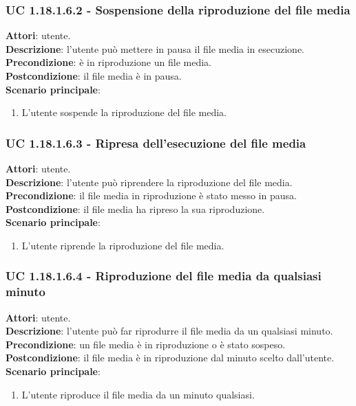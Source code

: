 	\subsubsection{UC 1.18.1.6.2 - Sospensione della riproduzione del file media}{
		\label{uc1.18.1.6.2}
		\textbf{Attori}: utente. \\
		\textbf{Descrizione}: l'utente può mettere in pausa il file media in esecuzione. \\
		\textbf{Precondizione}: è in riproduzione un file media.	\\
		\textbf{Postcondizione}: il file media è in pausa.\\
		\textbf{Scenario principale}:
		\begin{enumerate}
			\item L'utente sospende la riproduzione del file media.
		\end{enumerate}		
	}
	\subsubsection{UC 1.18.1.6.3 - Ripresa dell'esecuzione del file media}{
		\label{uc1.18.1.6.3}
		\textbf{Attori}: utente. \\
		\textbf{Descrizione}: l'utente può riprendere la riproduzione del file media. \\
		\textbf{Precondizione}: il file media in riproduzione è stato messo in pausa.	\\
		\textbf{Postcondizione}: il file media ha ripreso la sua riproduzione.\\
		\textbf{Scenario principale}:
		\begin{enumerate}
			\item L'utente riprende la riproduzione del file media.
		\end{enumerate}		
	}
	\subsubsection{UC 1.18.1.6.4 - Riproduzione del file media da qualsiasi minuto}{
		\label{uc1.18.1.6.4}
		\textbf{Attori}: utente. \\
		\textbf{Descrizione}: l'utente può far riprodurre il file media da un qualsiasi minuto. \\
		\textbf{Precondizione}: un file media è in riproduzione o è stato sospeso.	\\
		\textbf{Postcondizione}: il file media è in riproduzione dal minuto scelto dall'utente.\\
		\textbf{Scenario principale}:
		\begin{enumerate}
			\item L'utente riproduce il file media da un minuto qualsiasi. 
		\end{enumerate}		
	}
